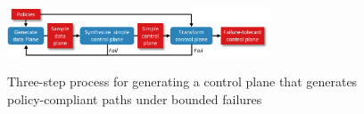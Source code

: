 


\begin{figure}
\centering
\includegraphics[width=0.7\textwidth]{figures/process.pdf}
\label{fig:process}
\caption{Three-step process for generating a control plane that generates
    policy-compliant paths under bounded failures}
\end{figure}


